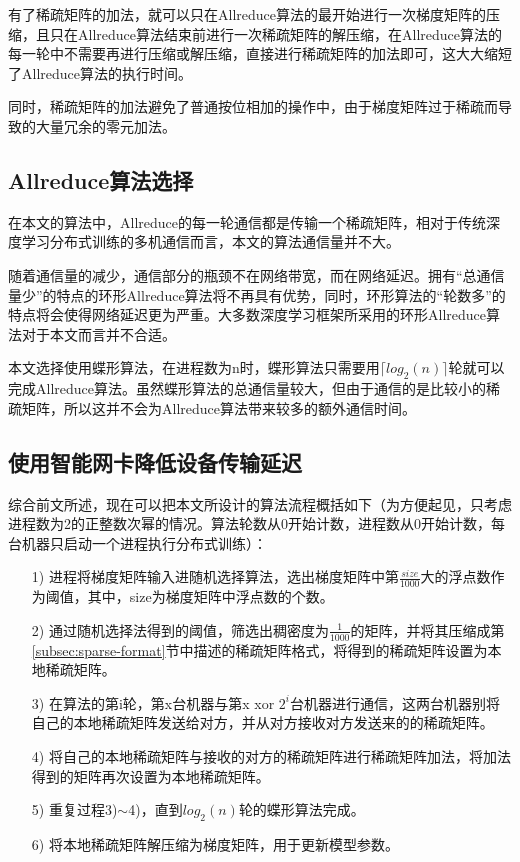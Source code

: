 有了稀疏矩阵的加法，就可以只在Allreduce算法的最开始进行一次梯度矩阵的压缩，且只在Allreduce算法结束前进行一次稀疏矩阵的解压缩，在Allreduce算法的每一轮中不需要再进行压缩或解压缩，直接进行稀疏矩阵的加法即可，这大大缩短了Allreduce算法的执行时间。

同时，稀疏矩阵的加法避免了普通按位相加的操作中，由于梯度矩阵过于稀疏而导致的大量冗余的零元加法。

\subsection{Allreduce算法选择}
在本文的算法中，Allreduce的每一轮通信都是传输一个稀疏矩阵，相对于传统深度学习分布式训练的多机通信而言，本文的算法通信量并不大。

随着通信量的减少，通信部分的瓶颈不在网络带宽，而在网络延迟。拥有“总通信量少”的特点的环形Allreduce算法将不再具有优势，同时，环形算法的“轮数多”的特点将会使得网络延迟更为严重。大多数深度学习框架所采用的环形Allreduce算法对于本文而言并不合适。

本文选择使用蝶形算法，在进程数为n时，蝶形算法只需要用$\lceil log_2(n) \rceil$轮就可以完成Allreduce算法。虽然蝶形算法的总通信量较大，但由于通信的是比较小的稀疏矩阵，所以这并不会为Allreduce算法带来较多的额外通信时间。

\subsection{使用智能网卡降低设备传输延迟}
综合前文所述，现在可以把本文所设计的算法流程概括如下（为方便起见，只考虑进程数为2的正整数次幂的情况。算法轮数从0开始计数，进程数从0开始计数，每台机器只启动一个进程执行分布式训练）：
\begin{itemize}
  \item [1)]
  进程将梯度矩阵输入进随机选择算法，选出梯度矩阵中第$\frac{size}{1000}$大的浮点数作为阈值，其中，size为梯度矩阵中浮点数的个数。
  \item [2)] 
  通过随机选择法得到的阈值，筛选出稠密度为$\frac{1}{1000}$的矩阵，并将其压缩成第\ref{subsec:sparse-format}节中描述的稀疏矩阵格式，将得到的稀疏矩阵设置为本地稀疏矩阵。
  \item [3)]
  在算法的第i轮，第x台机器与第x xor $2^i$台机器进行通信，这两台机器别将自己的本地稀疏矩阵发送给对方，并从对方接收对方发送来的的稀疏矩阵。
  \item [4)]
  将自己的本地稀疏矩阵与接收的对方的稀疏矩阵进行稀疏矩阵加法，将加法得到的矩阵再次设置为本地稀疏矩阵。
  \item [5)]
  重复过程3)$\sim$4)，直到$log_2(n)$轮的蝶形算法完成。
  \item [6)]
  将本地稀疏矩阵解压缩为梯度矩阵，用于更新模型参数。
\end{itemize}

